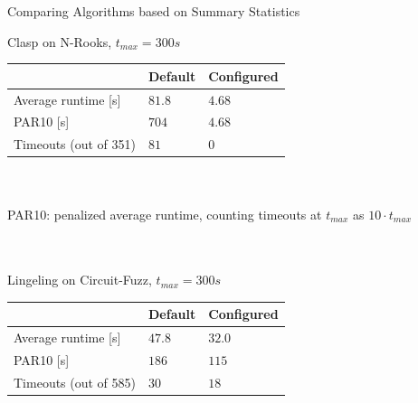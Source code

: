 \begin{frame}[c]{Comparing Algorithms based on Summary Statistics}


Clasp on N-Rooks, $t_{max} = 300s$\\
\begin{tabular}{| l | l | l |}
  \hline
  ~ & Default & Configured\\
  \hline
  Average runtime [s] & $81.8$ & $4.68$\\
  PAR10 [s] & $704$ & $4.68$\\
  Timeouts (out of 351) & $81$ & $0$\\
  \hline
\end{tabular}
~\\~\\
\alert{PAR10}: penalized average runtime, counting timeouts at $t_{max}$
as $10 \cdot t_{max}$ 
~\\~\\~
\pause

Lingeling on Circuit-Fuzz, $t_{max} = 300s$\\
\begin{tabular}{| l | l | l |}
  \hline
  ~ & Default & Configured\\
  \hline
  Average runtime [s] & $47.8$ & $32.0$\\
  PAR10 [s] & $186$ & $115$\\
  Timeouts (out of 585) & $30$ & $18$\\
  \hline
\end{tabular}

\end{frame}


